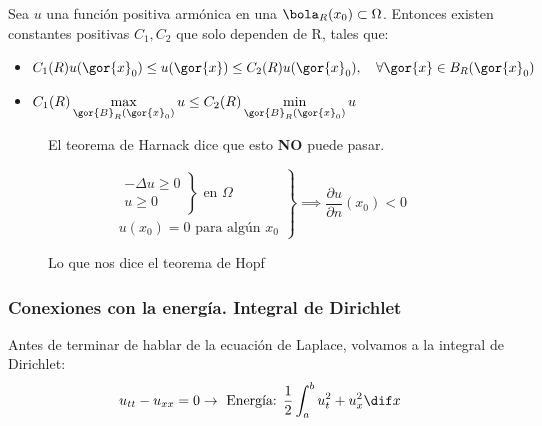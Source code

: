 		\begin{theorem} $ $ \\ %
		Sea $u$ una función positiva armónica en una $\bola_R(x_0) \subset \Omega$. Entonces existen constantes positivas $C_1, C_2$ que solo dependen de R, tales que:
		\begin{itemize}
				\item $C_1(R) u(\gor{x}_0) \leq u(\gor{x}) \leq C_2 (R) u(\gor{x}_0), \quad \forall \gor{x} \in B_R(\gor{x}_0)$
				\item $C_1(R)\max\limits_{\gor{B}_R(\gor{x}_0)} u \leq C_2(R) \min\limits_{\gor{B}_R(\gor{x}_0)} u $
			\end{itemize}
		\end{theorem}

		\begin{figure}[hbtp]
			\caption{El teorema de Harnack dice que esto {\bf NO} puede pasar.}
			\label{fig:ThmHarnack}
		\end{figure}

		\begin{theorem}
			\[ \left. \begin{array}{l} \left. \begin{array}{r}
				-\Delta u \geq 0  \\
				u \geq 0
			\end{array} \right\} \text{ en } \Omega \\
			u(x_0) = 0 \text{ para algún } x_0
			\end{array} \right\} \implies \frac{\partial u} {\partial n} (x_0) < 0
			\]
		\end{theorem}

		\begin{figure}[hbtp]
			\begin{minipage}[t]{0.5\linewidth}
			\end{minipage}
			\begin{minipage}[t]{0.5\linewidth}
			\end{minipage}
			\caption{Lo que nos dice el teorema de Hopf}
		\end{figure}

		\clearpage %
		\subsubsection{Conexiones con la energía. Integral de Dirichlet}
		Antes de terminar de hablar de la ecuación de Laplace, volvamos a la integral de Dirichlet:
		\[ u_{tt} - u_{xx} = 0 \rightarrow \text{ Energía: } \frac{1}{2} \int_a^b u_t^2 + u_x^2 \dif x \]


